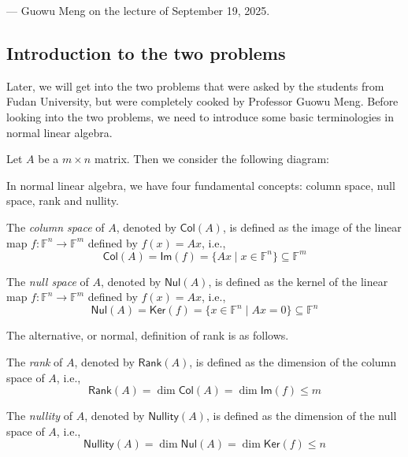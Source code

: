 \documentclass[
	11pt, %
	fleqn, %
	a4paper, %
]{LegrandOrangeBook}
\renewcommand{\ker}[1]{\mathsf{Ker}(#1)} %
\renewcommand{\Im}[1]{\mathsf{Im}(#1)} %
\newcommand{\F}{\mathbb{F}} %
\newcommand{\rank}[1]{\mathsf{Rank}(#1)} %
\newcommand{\nullity}[1]{\mathsf{Nullity}(#1)} %
\newcommand{\nul}[1]{\mathsf{Nul}(#1)} %
\newcommand{\col}[1]{\mathsf{Col}(#1)} %
\begin{document}
\begin{flushright}
    --- Guowu Meng on the lecture of September 19, 2025.
\end{flushright}

\subsection{Introduction to the two problems}

Later, we will get into the two problems that were asked by the students from Fudan University, but were completely cooked by Professor Guowu Meng. Before looking into the two problems, we need to introduce some basic terminologies in normal linear algebra.

Let $A$ be a $m \times n$ matrix. Then we consider the following diagram:
\begin{center}
\end{center}

In normal linear algebra, we have four fundamental concepts: column space, null space, rank and nullity.
\begin{definition}
    The \emph{column space} of $A$, denoted by $\col{A}$, is defined as the image of the linear map $f : \F^n \to \F^m$ defined by $f(x) = Ax$, i.e.,
    \[
        \col{A} = \Im{f} = \{ Ax \mid x \in \F^n \} \subseteq \F^m
    \]
\end{definition}

\newpage

\begin{definition}
    The \emph{null space} of $A$, denoted by $\nul{A}$, is defined as the kernel of the linear map $f : \F^n \to \F^m$ defined by $f(x) = Ax$, i.e.,
    \[
        \nul{A} = \ker{f} = \{ x \in \F^n \mid Ax = 0 \} \subseteq \F^n
    \]
\end{definition}

The alternative, or normal, definition of rank is as follows.
\begin{definition}[Rank]
    The \emph{rank} of $A$, denoted by $\rank{A}$, is defined as the dimension of the column space of $A$, i.e.,
    \[
        \rank{A} = \dim{\col{A}} = \dim{\Im{f}} \leq m
    \]
\end{definition}

\begin{definition}[Nullity]
    The \emph{nullity} of $A$, denoted by $\nullity{A}$, is defined as the dimension of the null space of $A$, i.e.,
    \[
        \nullity{A} = \dim{\nul{A}} = \dim{\ker{f}} \leq n
    \]
\end{definition}
\end{document}
